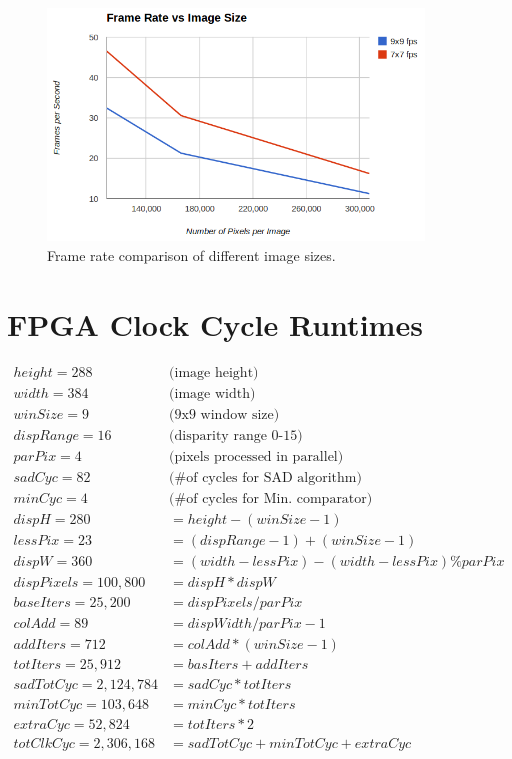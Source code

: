 \begin{figure}[h]
	\begin{center}
		\includegraphics[width=100mm]{figures/frameRate.png}
		\captionfonts
		\caption{Frame rate comparison of different image sizes.}
		\label{fig:frameRate}
	\end{center}
\end{figure}

\section{FPGA Clock Cycle Runtimes}

\begin{subequations}
\begin{align} 	\label{eq:clockCycles}
	height = 288 	\qquad & \text{(image height)}\\
	width = 384 	\qquad & \text{(image width)}\\
	winSize = 9	 	\qquad & \text{(9x9 window size)}\\
	dispRange = 16 	\qquad & \text{(disparity range 0-15)}\\
	parPix = 4 		\qquad & \text{(pixels processed in parallel)}\\
	sadCyc = 82		\qquad & \text{(\# of cycles for SAD algorithm)}\\
	minCyc = 4		\qquad & \text{(\# of cycles for Min. comparator)}\\
	dispH = 280 &= height - (winSize - 1) \\
	lessPix = 23 &= (dispRange-1) + (winSize-1) \\
	dispW = 360 &= (width-lessPix) - (width-lessPix) \% parPix \\
	dispPixels = 100,800 &= dispH * dispW \\
	baseIters = 25,200 &= dispPixels / parPix \\
	colAdd = 89 &= dispWidth / parPix - 1 \\
	addIters = 712 &= colAdd * (winSize-1) \\
	totIters = 25,912 &= basIters + addIters \\
	sadTotCyc = 2,124,784 &= sadCyc * totIters \\
	minTotCyc = 103,648 &= minCyc * totIters \\
	extraCyc = 52,824 &= totIters * 2 \\
	totClkCyc = 2,306,168 &= sadTotCyc + minTotCyc + extraCyc
\end{align}
\end{subequations}


